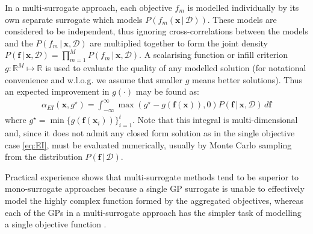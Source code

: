 \documentclass[conference]{IEEEtran}
\newcommand{\nobj}{M}
\newcommand\ei{EI\xspace}
\newcommand\gp{GP\xspace}
\newcommand{\given}{\,|\,}
\newcommand{\bx}{\mathbf{x}}
\newcommand{\bff}{\mathbf{f}}
\newcommand{\data}{\mathcal{D}}
\begin{document}
In a multi-surrogate approach, each objective $f_m$ is modelled
individually by its own separate surrogate which models
$P(f_m(\bx \given \data))$. These models are considered to be independent, thus ignoring cross-correlations between the models and the $P(f_m \given \bx, \data)$ are multiplied together to form the joint density $P(\bff \given \bx, \data) = \prod_{m=1}^\nobj P(f_m \given \bx, \data) $.
A scalarising function or infill criterion
$g : \mathbb{R}^\nobj \mapsto \mathbb{R}$ is used to evaluate the quality
of any modelled solution (for notational convenience and w.l.o.g. we assume that smaller $g$ means better solutions). Thus an expected improvement in $g(\cdot)$ may be found as:
\begin{align}
  \label{eq:EI-g}
    \alpha_{\ei}(\bx, g^\star) = \int_{-\infty}^\infty  \max(
  g^\star - g(\bff(\bx)), 0) P(\bff \given \bx,
  \data)\,d\bff
\end{align}
where $g^\star =  \min \{g(\bff(\bx_i))\}_{i=1}^t$.  Note that this
integral is multi-dimensional and, since it does not admit any closed form solution as in the single objective case \eqref{eq:EI},  must be
evaluated numerically, usually by Monte Carlo sampling from the distribution $P(\bff \given \data )$.

Practical experience shows that multi-surrogate methods tend to be superior to mono-surrogate approaches because a single \gp surrogate is unable to effectively model the highly complex function formed by the aggregated objectives, whereas each of the GPs in a multi-surrogate approach has the simpler task of modelling a single objective function \cite{rahat2017alternative}.   
\end{document}
